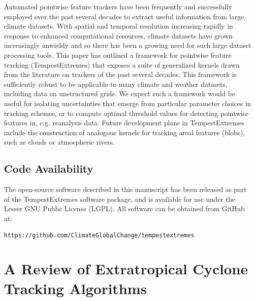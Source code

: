 \documentclass[gmdd, hvmath]{copernicus}
\begin{document}
\conclusions \label{sec:Conclusions}

Automated pointwise feature trackers have been frequently and successfully employed over the past several decades to extract useful information from large climate datasets.  With spatial and temporal resolution increasing rapidly in response to enhanced computational resources, climate datasets have grown increasingly unwieldy and so there has been a growing need for such large dataset processing tools.  This paper has outlined a framework for pointwise feature tracking (TempestExtremes) that exposes a suite of generalized kernels drawn from the literature on trackers of the past several decades.  This framework is sufficiently robust to be applicable to many climate and weather datasets, including data on unstructured grids.  We expect such a framework would be useful for isolating uncertainties that emerge from particular parameter choices in tracking schemes, or to compute optimal threshold values for detecting pointwise features in, e.g. reanalysis data.  Future development plans in TempestExtremes include the construction of analogous kernels for tracking areal features (blobs), such as clouds or atmospheric rivers.


\subsection*{Code Availability}

The open-source software described in this manuscript has been released as part of the TempestExtremes software package, and is available for use under the Lesser GNU Public License (LGPL).  All software can be obtained from GitHub at:
\begin{center}
\texttt{https://github.com/ClimateGlobalChange/tempestextremes}
\end{center} 


\appendix
\section{A Review of Extratropical Cyclone Tracking Algorithms} \label{sec:ExtratropicalCycloneAlgorithms}
\end{document}
